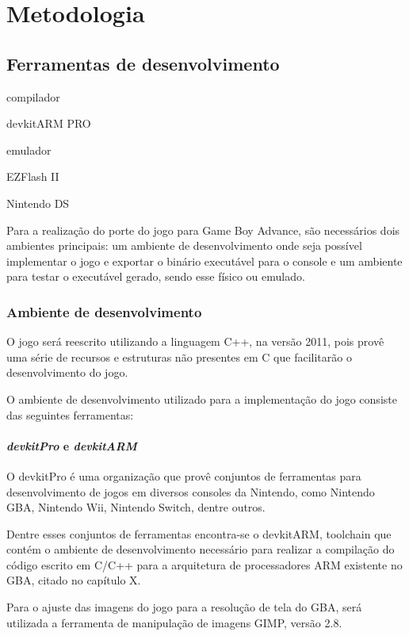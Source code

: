 \chapter[Metodologia]{Metodologia}

\section{Ferramentas de desenvolvimento}

  compilador

  devkitARM PRO

  emulador

  EZFlash II

  Nintendo DS

  Para a realização do porte do jogo para Game Boy Advance, são necessários dois ambientes principais: um ambiente de desenvolvimento onde seja possível implementar o jogo e exportar o binário executável para o console e um ambiente para testar o executável gerado, sendo esse físico ou emulado.

  \subsection{Ambiente de desenvolvimento}

    O jogo será reescrito utilizando a linguagem C++, na versão 2011, pois provê uma série de recursos e estruturas não presentes em C que facilitarão o desenvolvimento do jogo.

    O ambiente de desenvolvimento utilizado para a implementação do jogo consiste das seguintes ferramentas:

    \subsubsection{\textit{devkitPro} e \textit{devkitARM}}

      O devkitPro é uma organização que provê conjuntos de ferramentas para desenvolvimento de jogos em diversos consoles da Nintendo, como Nintendo GBA, Nintendo Wii, Nintendo Switch, dentre outros.

      Dentre esses conjuntos de ferramentas encontra-se o devkitARM, toolchain que contém o ambiente de desenvolvimento necessário para realizar a compilação do código escrito em C/C++ para a arquitetura de processadores ARM existente no GBA, citado no capítulo X.

    Para o ajuste das imagens do jogo para a resolução de tela do GBA, será utilizada a ferramenta de manipulação de imagens GIMP, versão 2.8.

